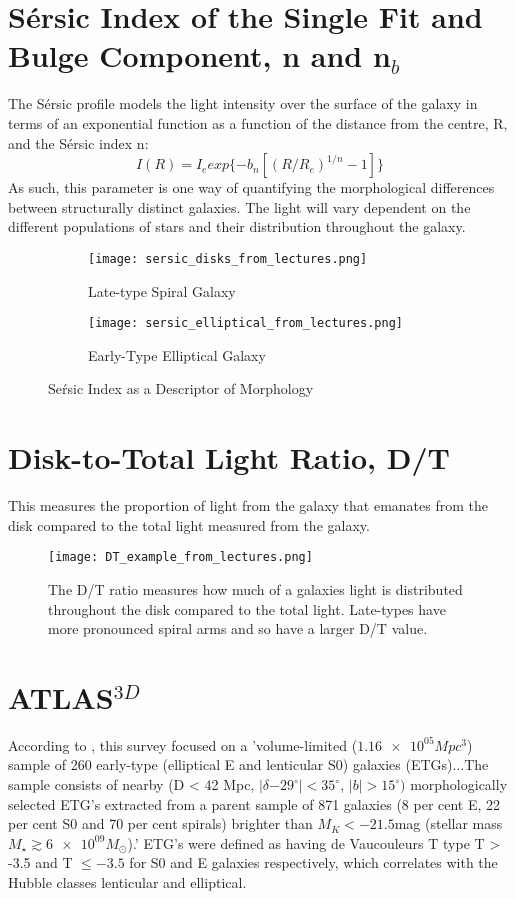 \section{S\'ersic Index of the Single Fit and Bulge Component, n and n$_{b}$}
The S\'ersic profile models the light intensity over the surface of the galaxy in terms of an exponential function as a function of the distance from the centre, R, and the S\'ersic index n:
\begin{equation}
I(R) = I_{e} exp\{-b_{n} [(R/R_{e})^{1/n}-1]\}
\end{equation}
As such, this parameter is one way of quantifying the morphological differences between structurally distinct galaxies. The light will vary dependent on the different populations of stars and their distribution throughout the galaxy.
\begin{figure}[h!]
	\centering
	\begin{subfigure}{.5\textwidth}
		\centering
		\texttt{[image: sersic\_disks\_from\_lectures.png]}
		\caption{Late-type Spiral Galaxy}
		\label{fig:sub1}
	\end{subfigure}%
	\begin{subfigure}{.5\textwidth}
		\centering
		\texttt{[image: sersic\_elliptical\_from\_lectures.png]}
		\caption{Early-Type Elliptical Galaxy}
		\label{fig:sub2}
	\end{subfigure}
	\caption{Se\'rsic Index as a Descriptor of Morphology}
	\label{fig:test}
\end{figure}

\section{Disk-to-Total Light Ratio, D/T}
This measures the proportion of light from the galaxy that emanates from the disk compared to the total light measured from the galaxy.
\begin{figure}[h!]
	\centering
	\texttt{[image: DT\_example\_from\_lectures.png]}
	\caption{The D/T ratio measures how much of a galaxies light is distributed throughout the disk compared to the total light. Late-types have more pronounced spiral arms and so have a larger D/T value. \cite{Lectures}
	}
	\label{fig:dtexample}
\end{figure}

\section{ATLAS$^{3D}$}
According to \cite{Cappellari2011}, this survey focused on a 'volume-limited ($\num{1.16e05} Mpc^{3}$) sample of 260 early-type (elliptical E and lenticular S0) galaxies (ETGs)...The sample consists of nearby (D < 42 Mpc, $|\delta \num{-29}^{\circ}| < 35^{\circ}$, $|b| > 15^{\circ})$ morphologically selected ETG's extracted from a parent sample of 871 galaxies (8 per cent E, 22 per cent S0 and
70 per cent spirals) brighter than $M_{K} <\num{-21.5} $mag (stellar mass $M_{\star} \gtrsim \num{6e09} M_{\odot}$).' ETG's were defined as having de Vaucouleurs T type T > -3.5 and T $\leq -3.5$ for S0 and E galaxies respectively, which correlates with the Hubble classes lenticular and elliptical.


